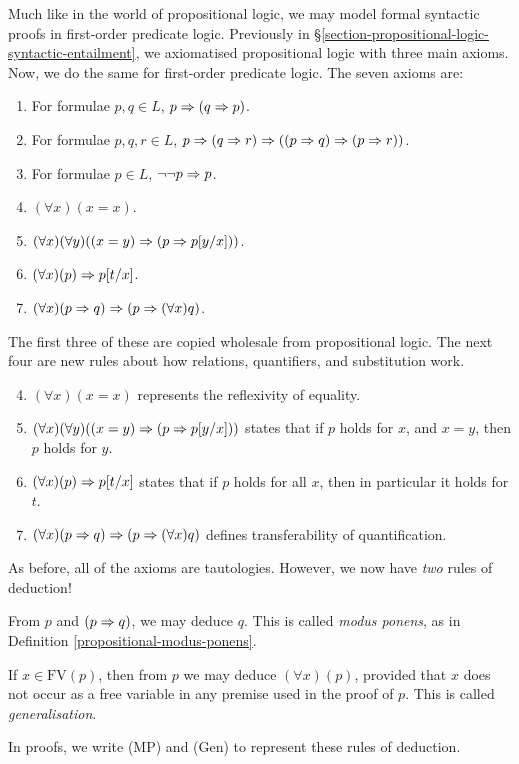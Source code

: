\documentclass{article}
\begin{document}
Much like in the world of propositional logic, we may model formal syntactic proofs in first-order predicate logic. Previously in \S\ref{section-propositional-logic-syntactic-entailment}, we axiomatised propositional logic with three main axioms. Now, we do the same for first-order predicate logic. The seven axioms are:
\begin{enumerate}
    \item For formulae $p, q \in L$, $p \Rightarrow (q \Rightarrow p)$.
    \item For formulae $p, q, r \in L$, $p \Rightarrow (q \Rightarrow r) \Rightarrow ((p \Rightarrow q) \Rightarrow (p \Rightarrow r))$.
    \item For formulae $p \in L$, $\lnot \lnot p \Rightarrow p$.
    \item $(\forall x)(x = x)$.
    \item $(\forall x)(\forall y)((x = y) \Rightarrow (p \Rightarrow p[y/x]))$.
    \item $(\forall x)(p) \Rightarrow p[t/x]$.
    \item $(\forall x)(p \Rightarrow q) \Rightarrow (p \Rightarrow (\forall x) q)$.
\end{enumerate}
The first three of these are copied wholesale from propositional logic. The next four are new rules about how relations, quantifiers, and substitution work.
\begin{enumerate}
	\setcounter{enumi}{3}
    \item $(\forall x)(x = x)$ represents the reflexivity of equality.
    \item $(\forall x)(\forall y)((x = y) \Rightarrow (p \Rightarrow p[y/x]))$ states that if $p$ holds for $x$, and $x = y$, then $p$ holds for $y$.
    \item $(\forall x)(p) \Rightarrow p[t/x]$ states that if $p$ holds for all $x$, then in particular it holds for $t$.
    \item $(\forall x)(p \Rightarrow q) \Rightarrow (p \Rightarrow (\forall x) q)$ defines transferability of quantification.
\end{enumerate}
As before, all of the axioms are tautologies. However, we now have \textit{two} rules of deduction!

\begin{definition}
	\label{first-order-deduction-rules}
    From $p$ and $(p \Rightarrow q)$, we may deduce $q$. This is called \textit{modus ponens}, as in Definition \ref{propositional-modus-ponens}.
    
    If $x \in \mathrm{FV}(p)$, then from $p$ we may deduce $(\forall x)(p)$, provided that $x$ does not occur as a free variable in any premise used in the proof of $p$. This is called \textit{generalisation}.
    
    In proofs, we write (MP) and (Gen) to represent these rules of deduction.
\end{definition}
\end{document}
